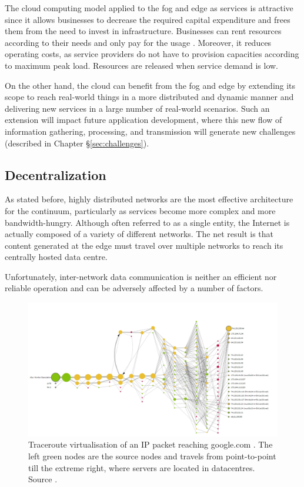 The cloud computing model applied to the fog and edge as services is attractive since it allows businesses to decrease the required capital expenditure and frees them from the need to invest in infrastructure. Businesses can rent resources according to their needs and only pay for the usage \cite{cloud-iot}. Moreover, it reduces operating costs, as service providers do not have to provision capacities according to maximum peak load. Resources are released when service demand is low.

On the other hand, the cloud can benefit from the fog and edge by extending its scope to reach real-world things in a more distributed and dynamic manner and delivering new services in a large number of real-world scenarios. Such an extension will impact future application development, where this new flow of information gathering, processing, and transmission will generate new challenges (described in Chapter §\ref{sec:challenges}).

\subsection{Decentralization}

As stated before, highly distributed networks are the most effective architecture for the continuum, particularly as services become more complex and more bandwidth-hungry. Although often referred to as a single entity, the Internet is actually composed of a variety of different networks. The net result is that content generated at the edge must travel over multiple networks to reach its centrally hosted data centre.

Unfortunately, inter-network data communication is neither an efficient nor reliable operation and can be adversely affected by a number of factors.

\begin{figure}[h]
\centering
\includegraphics[width=\columnwidth]{figures/traceroute}
\caption{Traceroute virtualisation of an IP packet reaching google.com \label{fig:traceroute}. The left green nodes are the source nodes and travels from point-to-point till the extreme right, where servers are located in datacentres. Source \cite{traceroute-google}.}
\end{figure}

